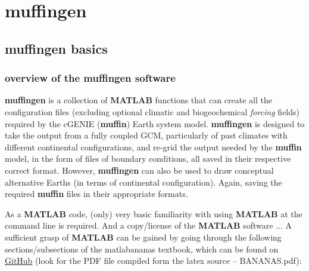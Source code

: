 \documentclass[11pt,fleqn]{book} %
\begin{document}

\cleardoublepage


\chapter{muffingen}

\hfill \break
\vspace{24mm}


\newpage

\section{muffingen basics}


\subsection{overview of the muffingen software}

\textbf{muffingen} is a collection of \textbf{MATLAB} functions that can create all the configuration files (excluding optional climatic and biogeochemical \textit{forcing} fields) required by the cGENIE (\textbf{muffin}) Earth system model. \textbf{muffingen} is designed to take the output from a fully coupled GCM, particularly of past climates with different continental configurations, and re-grid the output needed by the \textbf{muffin} model, in the form of files of boundary conditions, all  saved  in their respective correct format. However, \textbf{muffingen} can also be used to draw conceptual alternative Earths (in terms of continental configuration). Again, saving the required \textbf{muffin} files in their appropriate formats.

As a \textbf{MATLAB} code, (only) very basic familiarity with using \textbf{MATLAB} at the command line is required. And a copy/license of the \textbf{MATLAB} software ... A sufficient grasp of \textbf{MATLAB} can be gained by going through the following sections/subsections of the \textsf{matlabananas} textbook, which can be found on \href{https://github.com/derpycode/matlabananas}{GitHub} (look for the PDF file compiled form the latex source -- \textsf{BANANAS.pdf}):
\end{document}

